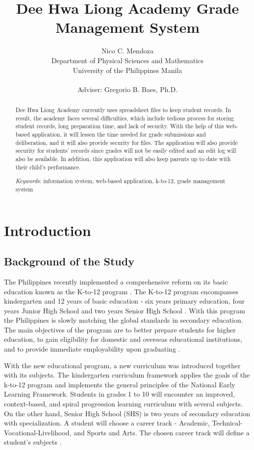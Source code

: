 \documentclass[11pt,a4paper,titlepage]{article}
\title {Dee Hwa Liong Academy Grade Management System}
\author {Nico C. Mendoza \\ Department of Physical Sciences and Mathematics \\ University of the Philippines Manila \\ \\ Adviser: Gregorio B. Baes, Ph.D.
}
\date{}
\let\stdsection\section
\renewcommand\section{\newpage\stdsection}
\newcommand{\Keywords}[1]{\par\noindent 
{\small{\em Keywords\/}: #1}}
\begin{document}
\maketitle
\doublespacing

\begin{abstract}
\thispagestyle{plain}
\setcounter{page}{2}
Dee Hwa Liong Academy currently uses spreadsheet files to keep student records. In result, the academy faces several difficulties, which include tedious process for storing student records, long preparation time, and lack of security. With the help of this web-based application, it will lessen the time needed for grade submissions and deliberation, and it will also provide security for files. The application will also provide security for students’ records since grades will not be easily edited and an edit log will also be available. In addition, this application will also keep parents up to date with their child’s performance.
\Keywords{information system, web-based application, k-to-12, grade management system}
\end{abstract}

\setcounter{page}{3}
\setcounter{tocdepth}{3}
\tableofcontents
\newpage

\section{Introduction}
\setcounter{page}{1}
\subsection{Background of the Study}

The Philippines recently implemented a comprehensive reform on its basic education known as the K-to-12 program \cite{Okabe}. The K-to-12 program encompasses kindergarten and 12 years of basic education - six years primary education, four years Junior High School and two years Senior High School \cite{Gazette}. With this program the Philippines is slowly matching the global standards in secondary education. The main objectives of the program are to better prepare students for higher education, to gain eligibility for domestic and overseas educational institutions, and to provide immediate employability upon graduating \cite{Okabe}.

With the new educational program, a new curriculum was introduced together with its subjects. The kindergarten curriculum framework applies the goals of the k-to-12 program and implements the general principles of the National Early Learning Framework. Students in grades 1 to 10 will encounter an improved, context-based, and spiral progression learning curriculum with several subjects. On the other hand, Senior High School (SHS) is two years of secondary education with specialization. A student will choose a career track - Academic, Technical-Vocational-Livelihood, and Sports and Arts. The chosen career track will define a student's subjects \cite{Okabe}.
\end{document}
